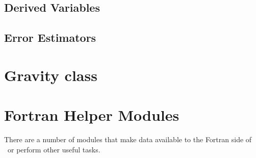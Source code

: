 \subsection{Derived Variables}

\subsection{Error Estimators}


\section{Gravity class}


\section{Fortran Helper Modules}

There are a number of modules that make data available to the Fortran
side of \castro\ or perform other useful tasks.

